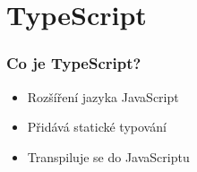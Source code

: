 \section{TypeScript}
\begin{frame}
    \frametitle{Co je TypeScript?}
    \begin{itemize}
        \item<1-> Rozšíření jazyka JavaScript
        \item<2-> Přidává statické typování
        \item<3-> Transpiluje se do JavaScriptu
    \end{itemize}
\end{frame}